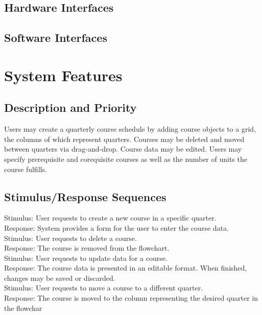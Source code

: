 \documentclass{scrreprt}
\begin{document}
\section{Hardware Interfaces}

\section{Software Interfaces}


\chapter{System Features}

\section{Description and Priority}
Users may create a quarterly course schedule by adding course objects to a grid, the columns of which represent quarters. Courses may be deleted and moved between quarters via drag-and-drop. Course data may be edited. Users may specify prerequisite and corequisite courses as well as the number of units the course fulfills.

\section{Stimulus/Response Sequences}
Stimulus: User requests to create a new course in a specific quarter. \\
Response: System provides a form for the user to enter the course data. \\
Stimulus: User requests to delete a course. \\
Response: The course is removed from the flowchart. \\
Stimulus: User requests to update data for a course. \\
Response: The course data is presented in an editable format. When finished, \\
changes may be saved or discarded. \\
Stimulus: User requests to move a course to a different quarter. \\
Response: The course is moved to the column representing the desired quarter in the flowchar
\end{document}
